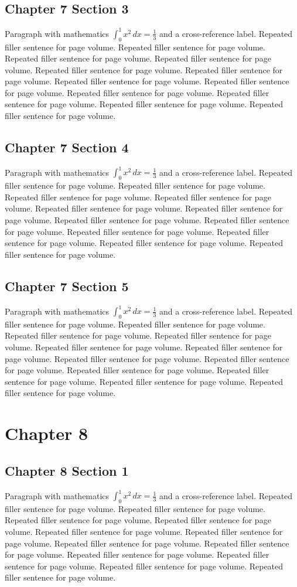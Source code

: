 \documentclass[11pt]{report}
\begin{document}
\section{Chapter 7 Section 3}
Paragraph with mathematics $\int_0^1 x^2\,dx = \frac13$ and a cross-reference label.
\label{sec:7:3}
Repeated filler sentence for page volume. Repeated filler sentence for page volume. Repeated filler sentence for page volume. Repeated filler sentence for page volume. Repeated filler sentence for page volume. Repeated filler sentence for page volume. Repeated filler sentence for page volume. Repeated filler sentence for page volume. Repeated filler sentence for page volume. Repeated filler sentence for page volume. Repeated filler sentence for page volume. Repeated filler sentence for page volume. 
\section{Chapter 7 Section 4}
Paragraph with mathematics $\int_0^1 x^2\,dx = \frac13$ and a cross-reference label.
\label{sec:7:4}
Repeated filler sentence for page volume. Repeated filler sentence for page volume. Repeated filler sentence for page volume. Repeated filler sentence for page volume. Repeated filler sentence for page volume. Repeated filler sentence for page volume. Repeated filler sentence for page volume. Repeated filler sentence for page volume. Repeated filler sentence for page volume. Repeated filler sentence for page volume. Repeated filler sentence for page volume. Repeated filler sentence for page volume. 
\section{Chapter 7 Section 5}
Paragraph with mathematics $\int_0^1 x^2\,dx = \frac13$ and a cross-reference label.
\label{sec:7:5}
Repeated filler sentence for page volume. Repeated filler sentence for page volume. Repeated filler sentence for page volume. Repeated filler sentence for page volume. Repeated filler sentence for page volume. Repeated filler sentence for page volume. Repeated filler sentence for page volume. Repeated filler sentence for page volume. Repeated filler sentence for page volume. Repeated filler sentence for page volume. Repeated filler sentence for page volume. Repeated filler sentence for page volume. 
\chapter{Chapter 8}
\section{Chapter 8 Section 1}
Paragraph with mathematics $\int_0^1 x^2\,dx = \frac13$ and a cross-reference label.
\label{sec:8:1}
Repeated filler sentence for page volume. Repeated filler sentence for page volume. Repeated filler sentence for page volume. Repeated filler sentence for page volume. Repeated filler sentence for page volume. Repeated filler sentence for page volume. Repeated filler sentence for page volume. Repeated filler sentence for page volume. Repeated filler sentence for page volume. Repeated filler sentence for page volume. Repeated filler sentence for page volume. Repeated filler sentence for page volume. 
\end{document}
